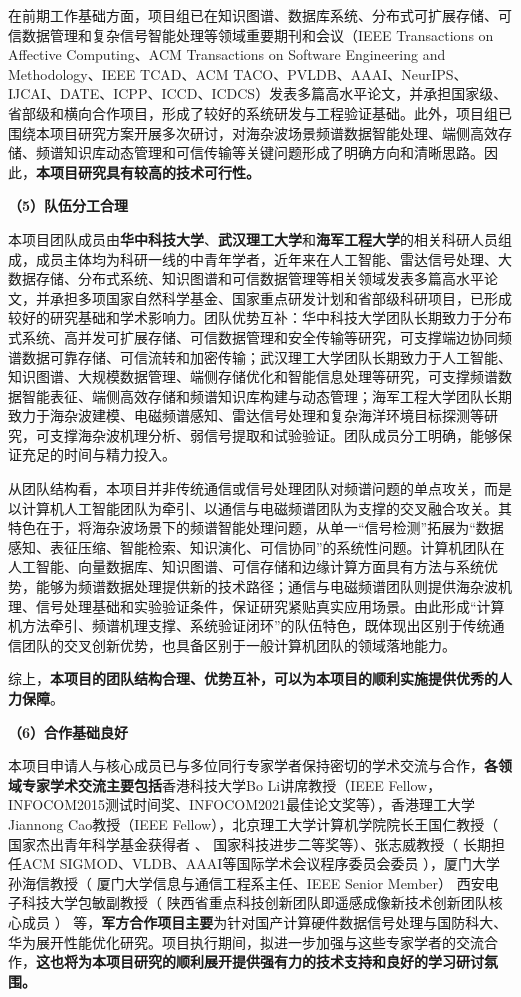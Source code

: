{	在前期工作基础方面，项目组已在知识图谱、数据库系统、分布式可扩展存储、可信数据管理和复杂信号智能处理等领域重要期刊和会议（IEEE Transactions on Affective Computing、ACM Transactions on Software Engineering and Methodology、IEEE TCAD、ACM TACO、PVLDB、AAAI、NeurIPS、IJCAI、DATE、ICPP、ICCD、ICDCS）发表多篇高水平论文，并承担国家级、省部级和横向合作项目，形成了较好的系统研发与工程验证基础。此外，项目组已围绕本项目研究方案开展多次研讨，对海杂波场景频谱数据智能处理、端侧高效存储、频谱知识库动态管理和可信传输等关键问题形成了明确方向和清晰思路。因此，\textbf{本项目研究具有较高的技术可行性。}
	
	\textbf{（5）队伍分工合理}
	
	本项目团队成员由\textbf{华中科技大学}、\textbf{武汉理工大学}和\textbf{海军工程大学}的相关科研人员组成，成员主体均为科研一线的中青年学者，近年来在人工智能、雷达信号处理、大数据存储、分布式系统、知识图谱和可信数据管理等相关领域发表多篇高水平论文，并承担多项国家自然科学基金、国家重点研发计划和省部级科研项目，已形成较好的研究基础和学术影响力。团队优势互补：华中科技大学团队长期致力于分布式系统、高并发可扩展存储、可信数据管理和安全传输等研究，可支撑端边协同频谱数据可靠存储、可信流转和加密传输；武汉理工大学团队长期致力于人工智能、知识图谱、大规模数据管理、端侧存储优化和智能信息处理等研究，可支撑频谱数据智能表征、端侧高效存储和频谱知识库构建与动态管理；海军工程大学团队长期致力于海杂波建模、电磁频谱感知、雷达信号处理和复杂海洋环境目标探测等研究，可支撑海杂波机理分析、弱信号提取和试验验证。团队成员分工明确，能够保证充足的时间与精力投入。
	
	从团队结构看，本项目并非传统通信或信号处理团队对频谱问题的单点攻关，而是以计算机人工智能团队为牵引、以通信与电磁频谱团队为支撑的交叉融合攻关。其特色在于，将海杂波场景下的频谱智能处理问题，从单一“信号检测”拓展为“数据感知、表征压缩、智能检索、知识演化、可信协同”的系统性问题。计算机团队在人工智能、向量数据库、知识图谱、可信存储和边缘计算方面具有方法与系统优势，能够为频谱数据处理提供新的技术路径；通信与电磁频谱团队则提供海杂波机理、信号处理基础和实验验证条件，保证研究紧贴真实应用场景。由此形成“计算机方法牵引、频谱机理支撑、系统验证闭环”的队伍特色，既体现出区别于传统通信团队的交叉创新优势，也具备区别于一般计算机团队的领域落地能力。
	
	综上，\textbf{本项目的团队结构合理、优势互补，可以为本项目的顺利实施提供优秀的人力保障}。
	
	\textbf{（6）合作基础良好}
	
	本项目申请人与核心成员已与多位同行专家学者保持密切的学术交流与合作，\textbf{各领域专家学术交流主要包括}香港科技大学Bo Li讲席教授（IEEE Fellow，INFOCOM2015测试时间奖、INFOCOM2021最佳论文奖等），香港理工大学Jiannong Cao教授（IEEE Fellow），北京理工大学计算机学院院长王国仁教授（
国家杰出青年科学基金获得者
、
国家科技进步二等奖等）、张志威教授（
长期担任ACM SIGMOD、VLDB、AAAI等国际学术会议程序委员会委员
），厦门大学孙海信教授（
厦门大学信息与通信工程系主任、IEEE Senior Member）
西安电子科技大学包敏副教授（
陕西省重点科技创新团队即遥感成像新技术创新团队核心成员
） 等，\textbf{军方合作项目主要}为针对国产计算硬件数据信号处理与国防科大、华为展开性能优化研究。项目执行期间，拟进一步加强与这些专家学者的交流合作，\textbf{这也将为本项目研究的顺利展开提供强有力的技术支持和良好的学习研讨氛围。}}
